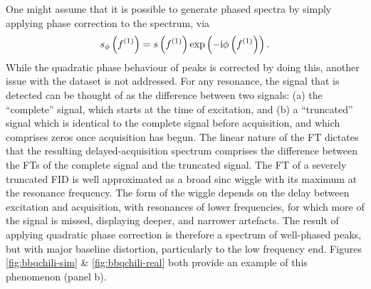 One might assume that it is possible to generate phased spectra by simply
applying phase correction to the spectrum, via
\begin{equation}
    s_{\phi} \left(f^{(1)}\right) =
        s\left(f^{(1)}\right) \exp\left(-\mathrm{i} \phi\left(f^{(1)}\right)\right).
        \label{eq:spec-phase-chili}
\end{equation}
While the quadratic phase behaviour of peaks is corrected by doing this,
another issue with the dataset is not addressed.
For any resonance, the signal that is detected can be thought of as
the difference between two signals: (a) the ``complete'' signal, which starts
at the time of excitation, and (b) a ``truncated'' signal which is identical to
the complete signal before acquisition, and which comprises zeros once
acquisition has begun. The linear nature of the \ac{FT} dictates that the
resulting delayed-acquisition spectrum comprises the difference between the
\acp{FT} of the complete signal and the truncated signal.  The \ac{FT} of a
severely
truncated \ac{FID} is well approximated as a broad sinc wiggle with its maximum
at the resonance frequency. The form of the wiggle depends on the delay between
excitation and acquisition, with resonances of lower frequencies, for which
more of the signal is missed, displaying deeper, and narrower artefacts. The
result of applying quadratic phase correction is therefore a spectrum of
well-phased peaks, but with major baseline distortion, particularly to the low
frequency end. Figures \ref{fig:bbqchili-sim} \& \ref{fig:bbqchili-real} both
provide an example of this phenomenon (panel b).

